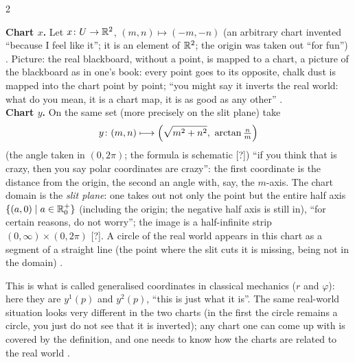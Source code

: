 \begin{paracol}{2}
\begin{example}\label{ex:c02-two-charts}
\textbf{Chart $x$.} Let $x\colon U\to\mathbb{R}^2$, $(m,n)\mapsto(-m,-n)$ (an arbitrary chart invented ``because I feel like it''; it is an element of $\mathbb{R}^2$; the origin was taken out ``for fun'')
. Picture: the real blackboard, without a point, is mapped to a chart, a picture of the blackboard as in one's book: every point goes to its opposite, chalk
dust is mapped into the chart point by point; ``you might say it inverts the real world: what do you mean, it is a chart map, it is as good as any other'' .\\
\textbf{Chart $y$.} On the same set (more precisely on the slit plane) take
\[
  y\colon(m,n)\longmapsto\Bigl(\sqrt{m^2+n^2},\ \arctan\tfrac nm\Bigr)
\]
(the angle taken in $(0,2\pi)$; the formula is schematic [?])
``if you think that is crazy, then you say polar coordinates are crazy'': the first coordinate is the distance from the origin, the second an angle with, say, the $m$-axis. The chart domain is the
\emph{slit plane}: one takes out not only the point but the entire half axis $\{(a,0)\mid a\in\mathbb{R}_0^+\}$ (including the origin; the negative half axis is still in), ``for certain reasons, do not worry'';
the image is a half-infinite strip $(0,\infty)\times(0,2\pi)$ [?]. A circle of the real world appears in this chart as a segment of a straight line (the point where the slit cuts it is missing, being not in the domain)
.
\end{example}
This is what is called generalised coordinates in classical mechanics ($r$ and $\varphi$): here they are $y^1(p)$ and $y^2(p)$, ``this is just what it is''. The same real-world situation looks very different in the two charts (in the first the
circle remains a circle, you just do not see that it is inverted); any chart one can come up with is covered by the definition, and one needs to know how the charts are related to the real world
.


\end{paracol}
